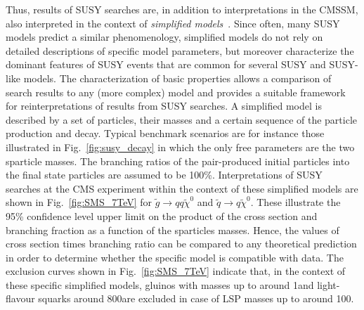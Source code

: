 Thus, results of SUSY searches are, in addition to interpretations in the CMSSM, also interpreted in the context of \textit{simplified models}~\cite{ArkaniHamed:2007fw, Alwall:2008ag, Alwall:2008va, Chatrchyan:2013sza}. Since often, many SUSY models predict a similar phenomenology, simplified models do not rely on detailed descriptions of specific model parameters, but moreover characterize the dominant features of SUSY events that are common for several SUSY and SUSY-like models. The characterization of basic properties allows a comparison of search results to any (more complex) model and provides a suitable framework for reinterpretations of results from SUSY searches. A simplified model is described by a set of particles, their masses and a certain sequence of the particle production and decay. Typical benchmark scenarios are for instance those illustrated in Fig.~\ref{fig:susy_decay} in which the only free parameters are the two sparticle masses. The branching ratios of the pair-produced initial particles into the final state particles are assumed to be 100\%. Interpretations of SUSY searches at the CMS experiment within the context of these simplified models are shown in Fig.~\ref{fig:SMS_7TeV} for $\tilde{g} \rightarrow qq\tilde{\chi}^0$ and $\tilde{q} \rightarrow q \tilde{\chi}^0$. These illustrate the 95\% confidence level upper limit on the product of the cross section and branching fraction as a function of the sparticles masses. Hence, the values of cross section times branching ratio can be compared to any theoretical prediction in order to determine whether the specific model is compatible with data. The exclusion curves shown in Fig.~\ref{fig:SMS_7TeV} indicate that, in the context of these specific simplified models, gluinos with masses up to around 1\tev and light-flavour squarks around 800\gev are excluded in case of LSP masses up to around 100\gev.
